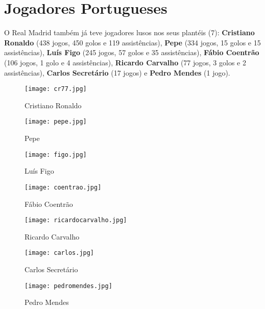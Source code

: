 \documentclass{report}
\begin{document}
\section{Jogadores Portugueses}
O Real Madrid também já teve jogadores lusos nos seus plantéis (7): \textbf{Cristiano Ronaldo} (438 jogos, 450 golos e 119 assistências), \textbf{Pepe} (334 jogos, 15 golos e 15 assistências), \textbf{Luís Figo} (245 jogos, 57 golos e 35 assistências), \textbf{Fábio Coentrão} (106 jogos, 1 golo e 4 assistências), \textbf{Ricardo Carvalho} (77 jogos, 3 golos e 2 assistências), \textbf{Carlos Secretário} (17 jogos) e \textbf{Pedro Mendes} (1 jogo). 
\begin{figure}[h]
    \centering
    \begin{minipage}{.24\textwidth}
        \centering
        \texttt{[image: cr77.jpg]}
        \caption{Cristiano Ronaldo}
        \label{fig:cr77}
    \end{minipage}\hspace{0.01\textwidth}%
    \begin{minipage}{.24\textwidth}
        \centering
        \texttt{[image: pepe.jpg]}
        \caption{Pepe}
        \label{fig:pepe}
    \end{minipage}\hspace{0.01\textwidth}%
    \begin{minipage}{.24\textwidth}
        \centering
        \texttt{[image: figo.jpg]}
        \caption{Luís Figo}
        \label{fig:figo}
    \end{minipage}\hspace{0.01\textwidth}%
    \begin{minipage}{.24\textwidth}
        \centering
        \texttt{[image: coentrao.jpg]}
        \caption{Fábio Coentrão}
        \label{fig:coentrao}
    \end{minipage}
    \par\bigskip %
    \begin{minipage}{.32\textwidth}
        \centering
        \texttt{[image: ricardocarvalho.jpg]}
        \caption{Ricardo Carvalho}
        \label{fig:ricardocarvalho}
    \end{minipage}\hspace{0.01\textwidth}%
    \begin{minipage}{.32\textwidth}
        \centering
        \texttt{[image: carlos.jpg]}
        \caption{Carlos Secretário}
        \label{fig:carlos}
    \end{minipage}\hspace{0.01\textwidth}%
    \begin{minipage}{.32\textwidth}
        \centering
        \texttt{[image: pedromendes.jpg]}
        \caption{Pedro Mendes}
        \label{fig:pedromendes}
    \end{minipage}
\end{figure}
\end{document}
